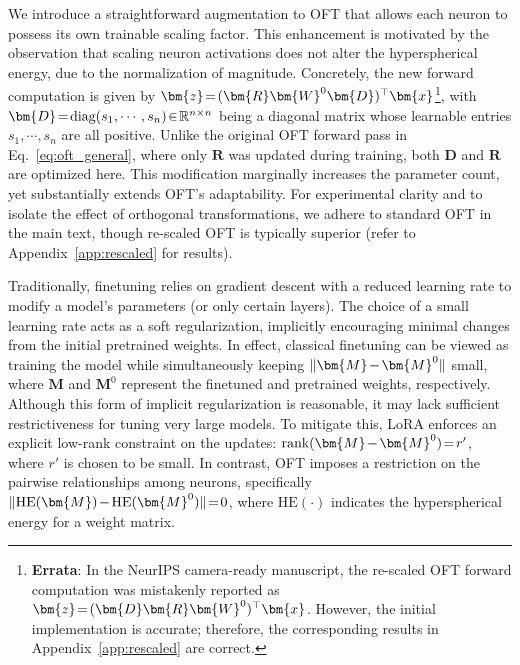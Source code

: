 We introduce a straightforward augmentation to OFT that allows each neuron to possess its own trainable scaling factor. This enhancement is motivated by the observation that scaling neuron activations does not alter the hyperspherical energy, due to the normalization of magnitude. Concretely, the new forward computation is given by $\thickmuskip=2mu \medmuskip=2mu\bm{z}=(\bm{R}\bm{W}^0\bm{D})^\top\bm{x}$\footnote{\textbf{Errata}: In the NeurIPS camera-ready manuscript, the re-scaled OFT forward computation was mistakenly reported as $\thickmuskip=2mu \medmuskip=2mu\bm{z}=(\bm{D}\bm{R}\bm{W}^0)^\top\bm{x}$. However, the initial implementation is accurate; therefore, the corresponding results in Appendix~\ref{app:rescaled} are correct.}, with $\thickmuskip=2mu \medmuskip=2mu \bm{D}=\text{diag}(s_1,\cdots,s_n)\in\mathbb{R}^{n\times n}$ being a diagonal matrix whose learnable entries $s_1,\cdots,s_n$ are all positive. Unlike the original OFT forward pass in Eq.~\eqref{eq:oft_general}, where only $\bm{R}$ was updated during training, both $\bm{D}$ and $\bm{R}$ are optimized here. This modification marginally increases the parameter count, yet substantially extends OFT's adaptability. For experimental clarity and to isolate the effect of orthogonal transformations, we adhere to standard OFT in the main text, though re-scaled OFT is typically superior (refer to Appendix~\ref{app:rescaled} for results).

Traditionally, finetuning relies on gradient descent with a reduced learning rate to modify a model’s parameters (or only certain layers). The choice of a small learning rate acts as a soft regularization, implicitly encouraging minimal changes from the initial pretrained weights. In effect, classical finetuning can be viewed as training the model while simultaneously keeping $\thickmuskip=2mu \medmuskip=2mu \| \bm{M} - \bm{M}^0\|$ small, where $\bm{M}$ and $\bm{M}^0$ represent the finetuned and pretrained weights, respectively. Although this form of implicit regularization is reasonable, it may lack sufficient restrictiveness for tuning very large models. To mitigate this, LoRA enforces an explicit low-rank constraint on the updates: $\thickmuskip=2mu \medmuskip=2mu \text{rank}(\bm{M} - \bm{M}^0)=r'$, where $r'$ is chosen to be small. In contrast, OFT imposes a restriction on the pairwise relationships among neurons, specifically $\thickmuskip=2mu \medmuskip=2mu \| \text{HE}(\bm{M})-\text{HE}(\bm{M}^0) \|=0$, where $\text{HE}(\cdot)$ indicates the hyperspherical energy for a weight matrix. 

